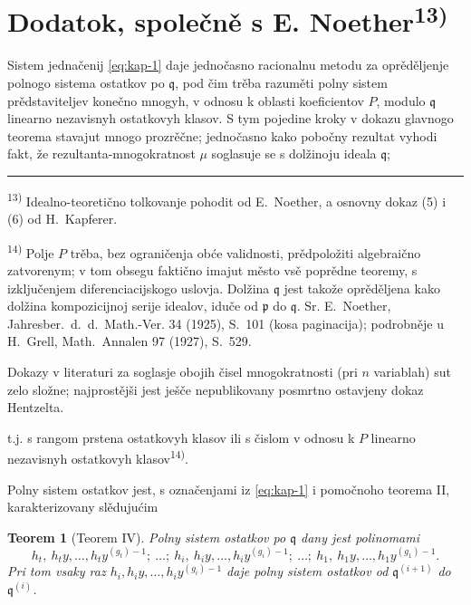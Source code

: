 \documentclass[11pt]{article}
\newcommand{\foreign}[1]{#1}
\theoremstyle{plain}
\newtheorem{satz}{Teorem}
\begin{document}
\newpage
\section*{Dodatok, společně s E. Noether\textsuperscript{13)}}

Sistem jednačenij \eqref{eq:kap-1} daje jednočasno racionalnu
metodu za oprěděljenje polnogo sistema ostatkov po $\mathfrak{q}$,
pod čim trěba razuměti polny sistem prědstaviteljev konečno mnogyh,
v odnosu k oblasti koeficientov $P$, modulo $\mathfrak{q}$ linearno
nezavisnyh ostatkovyh klasov. S tym pojedine kroky v dokazu
glavnogo teorema stavajut mnogo prozrěčne; jednočasno kako
pobočny rezultat vyhodi fakt, že rezultanta-mnogokratnost $\mu$
soglasuje se s dolžinoju ideala $\mathfrak{q}$;

\vspace{0.5em}
\noindent\rule{\textwidth}{0.4pt}
\vspace{0.3em}

{\footnotesize
\textsuperscript{13)} Idealno-teoretično tolkovanje pohodit od E.\ Noether, a osnovny
dokaz (5) i (6) od H.\ Kapferer.

\textsuperscript{14)} Polje $P$ trěba, bez ograničenja obće validnosti, prědpoložiti
algebraično zatvorenym; v tom obsegu faktično imajut město vsě poprědne
teoremy, s izključenjem diferenciacijskogo uslovja. Dolžina
$\mathfrak{q}$ jest takože oprěděljena kako dolžina kompozicijnoj
serije idealov, iduče od $\mathfrak{p}$ do $\mathfrak{q}$. Sr.
E.\ Noether, \foreign{Jahresber.\ d.\ d.\ Math.-Ver.} 34 (1925), S.~101
(kosa paginacija); podrobněje u H.\ Grell, \foreign{Math.\ Annalen} 97
(1927), S.~529.

Dokazy v literaturi za soglasje obojih čisel mnogokratnosti (pri
$n$ variablah) sut zelo složne; najprostějši jest ješče nepublikovany
posmrtno ostavjeny dokaz Hentzelta.
}

\vspace{1em}
t.j. s rangom prstena ostatkovyh klasov ili s čislom v odnosu k $P$
linearno nezavisnyh ostatkovyh klasov\textsuperscript{14)}.

Polny sistem ostatkov jest, s označenjami iz \eqref{eq:kap-1} i
pomočnoho teorema II, karakterizovany slědujućim

\begin{satz}[Teorem IV]\label{satz:kap-IV}
Polny sistem ostatkov po $\mathfrak{q}$ dany jest polinomami
\[
h_{t},\ h_{t}y,\ldots,h_{t}y^{(g_{t})-1};\ \ldots;\
h_{i},\ h_{i}y,\ldots,h_{i}y^{(g_{i})-1};\ \ldots;\
h_{1},\ h_{1}y,\ldots,h_{1}y^{(g_{1})-1}.
\]
Pri tom vsaky raz
$h_{i}, h_{i}y, \ldots, h_{i}y^{(g_{i})-1}$ daje polny
sistem ostatkov od $\mathfrak{q}^{(i+1)}$ do
$\mathfrak{q}^{(i)}$.
\end{satz}
\end{document}
